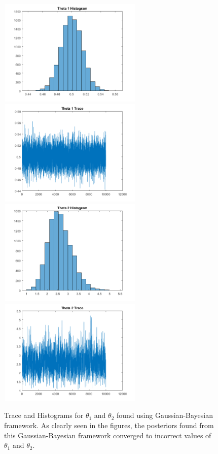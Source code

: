 \documentclass[botnum, fleqn]{unmeethesis}
\begin{document}
\begin{figure}
	\centering
	\includegraphics[width=2.7in,height=2in]{HistTheta1L2.png}
	\includegraphics[width=2.7in,height=2in]{TraceTheta1L2.png}
	\includegraphics[width=2.7in,height=2in]{HistTheta2L2.png}
	\includegraphics[width=2.7in,height=2in]{TraceTheta2L2.png}
	\caption{Trace and Histograms for $\theta_1$ and $\theta_2$ found using Gaussian-Bayesian framework. As clearly seen in the figures, the posteriors found from this Gaussian-Bayesian framework converged to incorrect values of $\theta_1$ and $\theta_2$.}
\end{figure}
\end{document}
